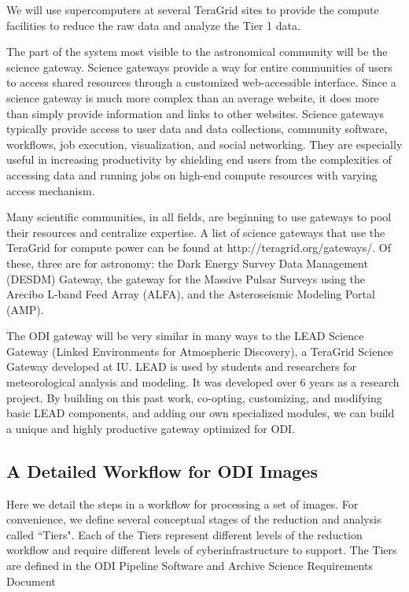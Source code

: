 \documentclass[10pt,conference]{IEEEtran}
\begin{document}
We will use supercomputers at several TeraGrid sites to provide the compute facilities to reduce the raw data and analyze the Tier 1 data. 

The part of the system most visible to the astronomical community will be the science gateway. Science gateways provide a way for entire communities of users to access shared resources through a customized web-accessible interface. Since a science gateway is much more complex than an average website, it does more than simply provide information and links to other websites. Science gateways typically provide access to user data and data collections, community software, workflows, job execution, visualization, and social networking. They are especially useful in increasing productivity by shielding end users from the complexities of accessing data and running jobs on high-end compute resources with varying access mechanism.

Many scientific communities, in all fields, are beginning to use gateways to pool their resources and centralize expertise.  A list of science gateways that use the TeraGrid for compute power can be found at http://teragrid.org/gateways/. Of these, three are for astronomy: the Dark Energy Survey Data Management (DESDM) Gateway, the gateway for the Massive Pulsar Surveys using the Arecibo L-band Feed Array (ALFA), and the Asteroseismic Modeling Portal (AMP).  

The ODI gateway will be very similar in many ways to the LEAD Science Gateway (Linked Environments for Atmospheric Discovery), a TeraGrid Science Gateway developed at IU. LEAD is used by students and researchers for meteorological analysis and modeling. It was developed over 6 years as a research project. By building on this past work, co-opting, customizing, and modifying basic LEAD components, and adding our own specialized modules, we can build a unique and highly productive gateway optimized for ODI.




\subsection{A Detailed Workflow for ODI Images}\label{sec:workflow}

Here we detail the steps in a workflow for processing a set of images. For convenience, we define several conceptual stages of the reduction and analysis called ``Tiers". Each of the Tiers represent different levels of the reduction workflow and require different levels of cyberinfrastructure to support. The Tiers are defined in the ODI Pipeline Software and Archive Science Requirements Document 
\end{document}
